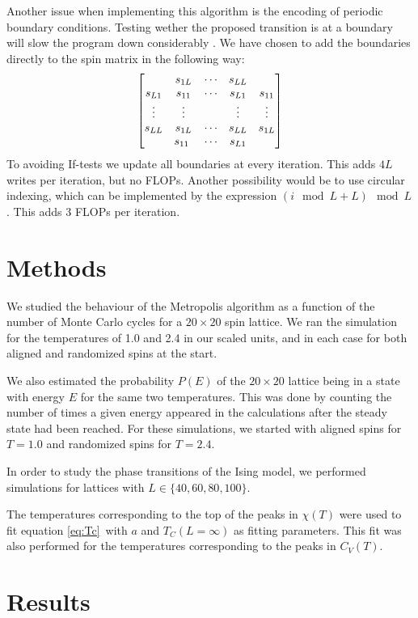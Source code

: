 \documentclass[a4paper,10pt,onecolumn]{article}
\begin{document}
Another issue when implementing this algorithm is the encoding of periodic boundary conditions. Testing wether the proposed transition is at a boundary will slow the program down considerably \cite{optimize}.  
We have chosen to add the boundaries directly to the spin matrix in the following way:
\[
\bmqty{
 & s_{1L} & \cdots & s_{LL} & \\
s_{L1} & s_{11}&\cdots&s_{L1} & s_{11}\\
\vdots & \vdots&&\vdots& \vdots\\
s_{LL} & s_{1L}&\cdots&s_{LL} & s_{1L}\\
 & s_{11} & \cdots & s_{L1} & }
\]
To avoiding If-tests we update all boundaries at every iteration. This adds $4L$ writes per iteration, but no FLOPs. 
Another possibility would be to use circular indexing, which can be implemented by the expression \((i\mod L + L)\mod L\). This adds 3 FLOPs per iteration. 


\section{Methods}

We studied the behaviour of the Metropolis algorithm as a function of the number of Monte Carlo cycles for a $20\times20$ spin lattice. We ran the simulation for the temperatures of 1.0 and 2.4 in our scaled units, and in each case for both aligned and randomized spins at the start. 

We also estimated the probability $P(E)$ of the $20\times20$ lattice being in a state with energy $E$ for the same two temperatures. This was done by counting the number of times a given energy appeared in the calculations after the steady state had been reached. For these simulations, we started with aligned spins for $T=1.0$ and randomized spins for $T=2.4$. 

In order to study the phase transitions of the Ising model, we performed simulations for lattices with $L\in\{40,60,80,100\}$.

The temperatures corresponding to the top of the peaks in $\chi(T)$ were used to fit equation \ref{eq:Tc} with $a$ and $T_C(L=\infty)$ as fitting parameters.
This fit was also performed for the temperatures corresponding to the peaks in $C_V(T)$. 

%
%
%
\section{Results}
\end{document}
